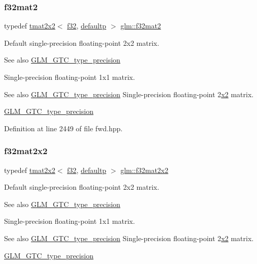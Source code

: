 \subsubsection{\texorpdfstring{f32mat2}{f32mat2}}
{\footnotesize\ttfamily typedef \mbox{\hyperlink{structglm_1_1tmat2x2}{tmat2x2}}$<$ \mbox{\hyperlink{group__gtc__type__precision_ga0ec999b57f5330d9021256e96038df04}{f32}}, \mbox{\hyperlink{namespaceglm_a0f04f086094c747d227af4425893f545a9d21ccd8b5a009ec7eb7677befc3bf51}{defaultp}} $>$ \mbox{\hyperlink{group__gtc__type__precision_ga29b40a1141234160a627a540eceedd31}{glm\+::f32mat2}}}

Default single-\/precision floating-\/point 2x2 matrix. \begin{DoxySeeAlso}{See also}
\mbox{\hyperlink{group__gtc__type__precision}{G\+L\+M\+\_\+\+G\+T\+C\+\_\+type\+\_\+precision}}
\end{DoxySeeAlso}
Single-\/precision floating-\/point 1x1 matrix. \begin{DoxySeeAlso}{See also}
\mbox{\hyperlink{group__gtc__type__precision}{G\+L\+M\+\_\+\+G\+T\+C\+\_\+type\+\_\+precision}} Single-\/precision floating-\/point 2\mbox{\hyperlink{glad_8h_ad2cea6eadb01f017f0d57e7edf0ce988}{x2}} matrix. 

\mbox{\hyperlink{group__gtc__type__precision}{G\+L\+M\+\_\+\+G\+T\+C\+\_\+type\+\_\+precision}} 
\end{DoxySeeAlso}


Definition at line 2449 of file fwd.\+hpp.

\mbox{\label{group__gtc__type__precision_gae7ebbb68656a5fd879d536b5d8452fb1}} 
\subsubsection{\texorpdfstring{f32mat2x2}{f32mat2x2}}
{\footnotesize\ttfamily typedef \mbox{\hyperlink{structglm_1_1tmat2x2}{tmat2x2}}$<$ \mbox{\hyperlink{group__gtc__type__precision_ga0ec999b57f5330d9021256e96038df04}{f32}}, \mbox{\hyperlink{namespaceglm_a0f04f086094c747d227af4425893f545a9d21ccd8b5a009ec7eb7677befc3bf51}{defaultp}} $>$ \mbox{\hyperlink{group__gtc__type__precision_gae7ebbb68656a5fd879d536b5d8452fb1}{glm\+::f32mat2x2}}}

Default single-\/precision floating-\/point 2x2 matrix. \begin{DoxySeeAlso}{See also}
\mbox{\hyperlink{group__gtc__type__precision}{G\+L\+M\+\_\+\+G\+T\+C\+\_\+type\+\_\+precision}}
\end{DoxySeeAlso}
Single-\/precision floating-\/point 1x1 matrix. \begin{DoxySeeAlso}{See also}
\mbox{\hyperlink{group__gtc__type__precision}{G\+L\+M\+\_\+\+G\+T\+C\+\_\+type\+\_\+precision}} Single-\/precision floating-\/point 2\mbox{\hyperlink{glad_8h_ad2cea6eadb01f017f0d57e7edf0ce988}{x2}} matrix. 

\mbox{\hyperlink{group__gtc__type__precision}{G\+L\+M\+\_\+\+G\+T\+C\+\_\+type\+\_\+precision}} 
\end{DoxySeeAlso}


